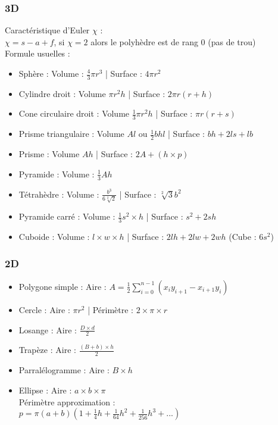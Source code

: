 \documentclass[8pt]{article}
\begin{document}
            \subsubsection{3D}
            Caractéristique d'Euler $\chi$ : \\
            $\chi = s-a+f$, si $\chi = 2$ alors le polyhèdre est de rang 0 (pas de trou)\\
            Formule usuelles :
            \begin{itemize}
                \item Sphère : Volume : $\frac{4}{3}\pi r^{3}$ | Surface : $4\pi r^{2}$
                \item Cylindre droit : Volume $\pi r^{2} h$ | Surface : $2\pi r( r + h)$
                \item Cone circulaire droit : Volume $\frac{1}{3} \pi r^{2} h$ | Surface : $\pi r( r + s)$
                \item Prisme triangulaire : Volume $A  l$ ou $\frac{1}{2}bhl$ | Surface : $bh + 2ls + lb$
                \item Prisme : Volume $Ah$ | Surface : $2A + (h \times p)$
                \item Pyramide : Volume : $\frac{1}{3}Ah$
                \item Tétrahèdre : Volume : $\frac{b^{3}}{6  \sqrt[2]{2}}$ | Surface : $\sqrt[2]{3}b^{2}$
                \item Pyramide carré : Volume : $\frac{1}{3}s^{2}\times h$ | Surface : $s^{2} + 2sh$
                \item Cuboide : Volume : $l\times w \times h$ | Surface : $2lh + 2lw +2wh$ (Cube : $6s^{2}$)
            \end{itemize}
            \subsubsection{2D}
            \begin{itemize}
                \item Polygone simple : Aire : $A = \frac{1}{2} \sum_{i=0}^{n-1}\left(x_{i}y_{i+1} - x_{i+1}y_{i}\right)$
                \item Cercle : Aire : $\pi r^{2}$ | Périmètre : $2\times \pi \times r$
                \item Losange : Aire : $\frac{D\times d}{2}$
                \item Trapèze : Aire : $\frac{(B+b)\times h}{2}$
                \item Parralélogramme : Aire : $B\times h$
                \item Ellipse : Aire : $a \times b \times \pi$ \\
                Périmètre approximation : \\
                $p = \pi (a+b) \left( 1 + \frac{1}{4}h + \frac{1}{64}h^2 + \frac{1}{256}h^3 + ...\right)$
            \end{itemize}
\end{document}
